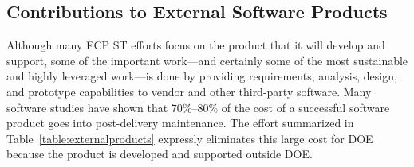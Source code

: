 \subsection{Contributions to External Software Products}\label{subsection:external-contributions}
Although many ECP ST efforts focus on the product that it will develop and support, some of the important work---and certainly some of the most sustainable and highly leveraged work---is done by providing requirements, analysis, design, and prototype capabilities to vendor and other third-party software.  Many software studies have shown that 70\%--80\% of the cost of a successful software product goes into post-delivery maintenance. The effort summarized in Table~\ref{table:externalproducts} expressly eliminates this large cost for DOE because the product is developed and supported outside DOE.


